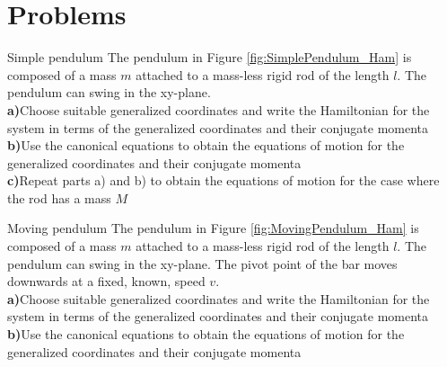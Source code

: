 %
\section{Problems}
\begin{problem}{Simple pendulum}
The pendulum in Figure \ref{fig:SimplePendulum_Ham} is composed of a mass $m$ attached to a mass-less rigid rod of the length $l$. The pendulum can swing in the xy-plane. 
\\
\textbf{a)}Choose suitable generalized coordinates and write the Hamiltonian for the system in terms of the generalized coordinates and their conjugate momenta\\
\textbf{b)}Use the canonical equations to obtain the equations of motion for the generalized coordinates and their conjugate momenta\\
\textbf{c)}Repeat parts a) and b) to obtain the equations of motion for the case where the rod has a mass $M$\\
\label{prob_Hamilton_1}
\end{problem}

\begin{problem}{Moving pendulum}
The pendulum in Figure \ref{fig:MovingPendulum_Ham} is composed of a mass $m$ attached to a mass-less rigid rod of the length $l$. The pendulum can swing in the xy-plane. The pivot point of the bar moves downwards at a fixed, known, speed $v$.
\\
\textbf{a)}Choose suitable generalized coordinates and write the Hamiltonian for the system in terms of the generalized coordinates and their conjugate momenta\\
\textbf{b)}Use the canonical equations to obtain the equations of motion for the generalized coordinates and their conjugate momenta\\
\label{prob_Hamilton_2}
\end{problem}


